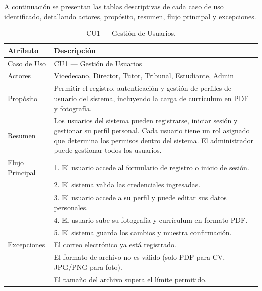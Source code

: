 A continuación se presentan las tablas descriptivas de cada caso de uso identificado, detallando actores, propósito, resumen, flujo principal y excepciones.

\begin{table}[H]
\centering
\caption{CU1 — Gestión de Usuarios.}
\label{tab:cu1}
\begin{tabular}{lp{10cm}}
\toprule
\textbf{Atributo} & \textbf{Descripción} \\
\midrule
Caso de Uso & CU1 — Gestión de Usuarios \\
Actores & Vicedecano, Director, Tutor, Tribunal, Estudiante, Admin \\
Propósito & Permitir el registro, autenticación y gestión de perfiles de usuario del sistema, incluyendo la carga de currículum en PDF y fotografía. \\
Resumen & Los usuarios del sistema pueden registrarse, iniciar sesión y gestionar su perfil personal. Cada usuario tiene un rol asignado que determina los permisos dentro del sistema. El administrador puede gestionar todos los usuarios. \\
Flujo Principal & 1. El usuario accede al formulario de registro o inicio de sesión. \\
& 2. El sistema valida las credenciales ingresadas. \\
& 3. El usuario accede a su perfil y puede editar sus datos personales. \\
& 4. El usuario sube su fotografía y currículum en formato PDF. \\
& 5. El sistema guarda los cambios y muestra confirmación. \\
Excepciones & El correo electrónico ya está registrado. \\
& El formato de archivo no es válido (solo PDF para CV, JPG/PNG para foto). \\
& El tamaño del archivo supera el límite permitido. \\
\bottomrule
\end{tabular}
\end{table}

